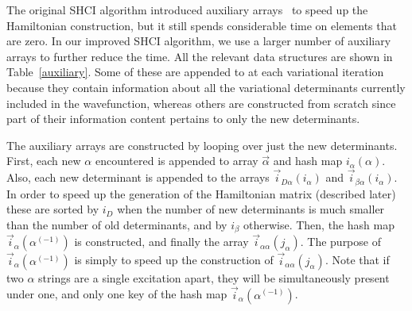 \documentclass[%
reprint,
 superscriptaddress,
 amsmath,amssymb,
 aps,
]{revtex4-1}
\def\veca{\vec{\alpha}}
\def\vecb{\vec{\beta}}
\def\ia{i_\alpha}
\def\ib{i_\beta}
\def\vecia{\vec{i}_\alpha}
\def\veciDa{\vec{i}_{D\alpha}}
\def\veciaa{\vec{i}_{\alpha\alpha}}
\def\veciba{\vec{i}_{\beta\alpha}}
\begin{document}
The original SHCI algorithm introduced
auxiliary arrays~\cite{ShaHolJeaAlaUmr-JCTC-17} to speed up the Hamiltonian construction,
but it still spends considerable time on elements that are zero.
In our improved SHCI algorithm, we use a larger number of auxiliary arrays to further reduce the time.
All the relevant data structures are shown in Table~\ref{auxiliary}.
Some of these are appended to at each variational iteration because they contain information about all the variational determinants
currently included in the wavefunction, whereas others are constructed from scratch since part of their information content
pertains to only the new determinants.

The auxiliary arrays are constructed by looping over just the new determinants.
First, each new $\alpha$ encountered is appended to array $\veca$ and hash map $\ia(\alpha)$.
Also, each new determinant is appended to the arrays $\veciDa(\ia)$ and $\veciba(\ia)$.
In order to speed up the generation of the Hamiltonian matrix (described later) these
are sorted by $i_D$ when the number of new determinants is much smaller than the number of old determinants,
and by $\ib$
otherwise.
Then, the hash map $\vecia(\alpha^{(-1)})$ is constructed, and finally the array $\veciaa(j_\alpha)$.
The purpose of $\vecia(\alpha^{(-1)})$ is simply to speed up the construction of $\veciaa(j_\alpha)$.
Note that if two $\alpha$ strings are a single excitation apart, they will be simultaneously present under one, and only one key of the hash map $\vecia(\alpha^{(-1)})$.
\end{document}
